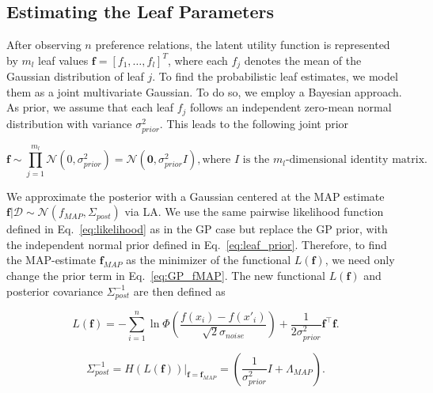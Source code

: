 \documentclass{article}
\begin{document}
\subsection{Estimating the Leaf Parameters}\label{sec:leaf_fitting}
After observing $n$ preference relations, the latent utility function is represented by $m_l$ leaf values $\mathbf{f} =[f_1, \ldots ,f_l]^T$, where each $f_j$ denotes the mean of the Gaussian distribution of leaf $j$. To find the probabilistic leaf estimates, we model them as a joint multivariate Gaussian. To do so, we employ a Bayesian approach. As prior, we assume that each leaf $f_j$ follows an independent zero-mean normal distribution with variance $\sigma_{prior}^2$. This leads to the following joint prior

\begin{equation}\label{eq:leaf_prior}
    \mathbf{f} \sim \prod_{j=1}^{m_l} \mathcal{N}(0,\sigma_{prior}^2) = \mathcal{N}(\mathbf{0}, \sigma_{prior}^2I), \text{where } I \text{ is the $m_l$-dimensional identity matrix}.
\end{equation}

We approximate the posterior with a Gaussian centered at the MAP estimate $\mathbf{f}|\mathcal{D} \sim \mathcal{N}(f_{MAP}, \Sigma_{post})$ via LA. We use the same pairwise likelihood function defined in Eq.~\ref{eq:likelihood} as in the GP case but replace the GP prior, with the independent normal prior defined in Eq.~\ref{eq:leaf_prior}. Therefore, to find the MAP-estimate $\mathbf{f}_{MAP}$ as the minimizer of the functional $L(\mathbf{f})$, we need only change the prior term in Eq.~\ref{eq:GP_fMAP}. The new functional $L(\mathbf{f})$ and posterior covariance $\Sigma_{post}^{-1}$ are then defined as

\begin{equation*}
    L(\mathbf{f}) = - \sum_{i=1}^n \ln \Phi(\frac{f(x_i) - f(x'_i)}{\sqrt{2}\sigma_{noise} }) + \frac{1}{2\sigma_{prior}^2}\mathbf{f}^\top \mathbf{f}.
\end{equation*}

\begin{equation}\label{eq:DT_cov}
    \Sigma_{post}^{-1} = H(L(\mathbf{f}))|_{\mathbf{f} = \mathbf{f}_{MAP}} = ( \frac{1}{\sigma_{prior}^2}I + \Lambda_{MAP}).
\end{equation}
\end{document}
